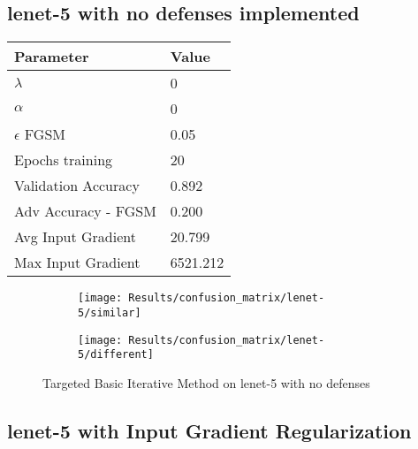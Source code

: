 \documentclass[draft,final]{vutinfth} %
\begin{document}
\subsection{lenet-5 with no defenses implemented}

\begin{table}[h]
  \centering
  \begin{tabular}{ll}
    \toprule
			Parameter			& Value   \\
    \midrule
			$\lambda$								& 0				\\
			$\alpha$								& 0				\\
			$\epsilon$ FGSM					& 0.05		\\
			Epochs training					& 20			\\
			
			Validation Accuracy			& 0.892		\\ 
			Adv Accuracy - FGSM			& 0.200		\\
			
			Avg Input Gradient			& 20.799	\\
			Max Input Gradient			& 6521.212\\
    \bottomrule
  \end{tabular}
\end{table}


\begin{figure}[h]
  \begin{subfigure}[b]{0.5\columnwidth}
		\centering
    \texttt{[image: Results/confusion\_matrix/lenet-5/similar]}
    \label{fig:exp:cm:lenet-5:similar}
  \end{subfigure}
  \begin{subfigure}[b]{0.5\columnwidth}
		\centering
    \texttt{[image: Results/confusion\_matrix/lenet-5/different]}
    \label{fig:exp:cm:lenet-5:different}
  \end{subfigure}
  \caption{Targeted Basic Iterative Method on lenet-5 with no defenses}
  \label{fig:exp:cm:lenet-5}
\end{figure}
\clearpage

\subsection{lenet-5 with Input Gradient Regularization}
\end{document}
